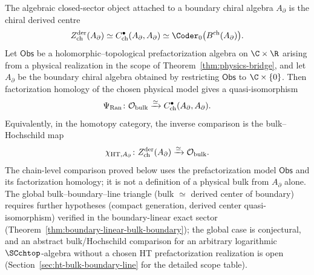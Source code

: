 \begin{theorem}
\label{thm:bulk_hochschild}
The algebraic closed-sector object attached to a boundary chiral
algebra \(A_\partial\) is the chiral derived centre
\[
Z^{\mathrm{der}}_{\mathrm{ch}}(A_{\partial})
\simeq C^\bullet_{\mathrm{ch}}(A_{\partial},A_{\partial})
\simeq \Coder_0\bigl(B^{\mathrm{ch}}(A_\partial)\bigr).
\]
Let $\mathsf{Obs}$ be a holomorphic--topological prefactorization
algebra on $\C\times\R$ arising from a physical realization in the
scope of Theorem~\ref{thm:physics-bridge}, and let $A_{\partial}$ be
the boundary chiral algebra obtained by restricting $\mathsf{Obs}$ to
$\C\times\{0\}$. Then factorization homology of the chosen physical
model gives a quasi-isomorphism
\begin{equation}
\Psi_{\mathrm{Ran}}\colon
\mathcal{O}_{\textup{bulk}}
\xrightarrow{\simeq}
C^\bullet_{\textup{ch}}(A_{\partial}, A_{\partial}).
\end{equation}
Equivalently, in the homotopy category, the inverse comparison is the
bulk--Hochschild map
\[
\chi_{\mathrm{HT},A_\partial}\colon
Z^{\mathrm{der}}_{\mathrm{ch}}(A_\partial)
\xrightarrow{\simeq}
\mathcal{O}_{\textup{bulk}}.
\]
The chain-level comparison proved below uses the prefactorization
model $\mathsf{Obs}$ and its factorization homology; it is not a
definition of a physical bulk from \(A_\partial\) alone.
The global bulk--boundary--line triangle
\textup{(}bulk $\simeq$ derived center of boundary\textup{)} requires further hypotheses
\textup{(}compact generation, derived center quasi-isomorphism\textup{)} verified
in the boundary-linear exact sector
\textup{(}Theorem~\textup{\ref{thm:boundary-linear-bulk-boundary}}\textup{)};
the global case is conjectural, and an abstract bulk/Hochschild comparison for an arbitrary logarithmic $\SCchtop$-algebra without a chosen HT prefactorization realization is open
\textup{(}Section~\textup{\ref{sec:ht-bulk-boundary-line}} for the detailed scope table\textup{)}.
\end{theorem}

